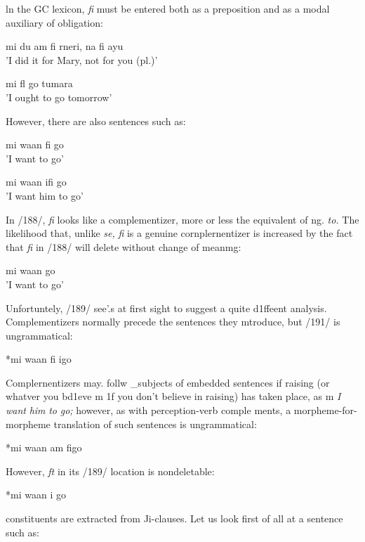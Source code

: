 ln the GC lexicon, \textit{fi} must be entered both as a preposition and as a modal auxiliary of obligation:

\ea\label{ex:186}
   mi du am fi rneri, na fi ayu\\
\glt 'I did it for Mary, not for you (pl.)'
\z



\ea\label{ex:187}
  mi fl go tumara\\
\glt 'I ought to go tomorrow'
\z



However, there are also sentences such as:

\ea\label{ex:188}
 mi waan fi go\\
\glt 'I want to go'
\z



\ea\label{ex:189}
 mi waan ifi go\\
\glt 'I want him to go'
\z



In /188/, \textit{fi} looks like a complementizer, more or less the equivalent of ng. \textit{to.} The likelihood that, unlike \textit{se,} \textit{fi} is a genuine cornplernentizer
is increased by the fact that \textit{fi }in /188/ will delete without change of meanmg:

\ea\label{ex:190}
 mi waan go \\
\glt 'I want to go'
\z



Unfortuntely, /189/ see'.{\textquotedbl}s at first sight to suggest a quite d1ffeent analysis. Complementizers normally precede the sentences they mtroduce, but /191/ is ungrammatical:

\ea\label{ex:191}
 *mi waan fi igo
\z

Complernentizers may. follw \_subjects of embedded sentences if raising (or whatver you bd1eve m 1f you don't believe in raising) has taken place, as m \textit{I} \textit{want} \textit{him} \textit{to} \textit{go;} however, as with perception-verb comple%
ments, a morpheme-for-morpheme translation of such sentences is ungrammatical:

\ea\label{ex:192}
 *mi waan am figo
\glt
\z

However, \textit{ft} in its /189/ location is nondeletable:

\ea\label{ex:193}
 *mi waan i go
\z


constituents are extracted from Ji-clauses. Let us look first of all at
a sentence such as:

